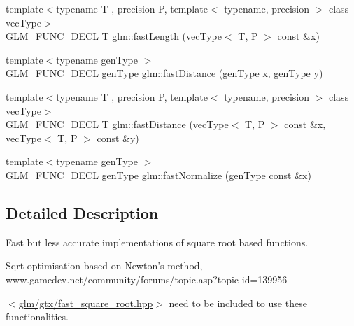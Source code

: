 \begin{DoxyCompactItemize}
{\footnotesize template$<$typename T , precision P, template$<$ typename, precision $>$ class vec\-Type$>$ }\\G\-L\-M\-\_\-\-F\-U\-N\-C\-\_\-\-D\-E\-C\-L T \hyperlink{group__gtx__fast__square__root_gae28a3099cbd6404a4ea8ef22147ed7b0}{glm\-::fast\-Length} (vec\-Type$<$ T, P $>$ const \&x)
\item 
{\footnotesize template$<$typename gen\-Type $>$ }\\G\-L\-M\-\_\-\-F\-U\-N\-C\-\_\-\-D\-E\-C\-L gen\-Type \hyperlink{group__gtx__fast__square__root_gaac333418d0c4e0cc6d3d219ed606c238}{glm\-::fast\-Distance} (gen\-Type x, gen\-Type y)
\item 
{\footnotesize template$<$typename T , precision P, template$<$ typename, precision $>$ class vec\-Type$>$ }\\G\-L\-M\-\_\-\-F\-U\-N\-C\-\_\-\-D\-E\-C\-L T \hyperlink{group__gtx__fast__square__root_ga6d1ac559cd77d69119e30c3aca0e14b5}{glm\-::fast\-Distance} (vec\-Type$<$ T, P $>$ const \&x, vec\-Type$<$ T, P $>$ const \&y)
\item 
{\footnotesize template$<$typename gen\-Type $>$ }\\G\-L\-M\-\_\-\-F\-U\-N\-C\-\_\-\-D\-E\-C\-L gen\-Type \hyperlink{group__gtx__fast__square__root_ga3b02c1d6e0c754144e2f1e110bf9f16c}{glm\-::fast\-Normalize} (gen\-Type const \&x)
\end{DoxyCompactItemize}


\subsection{Detailed Description}
Fast but less accurate implementations of square root based functions. 
\begin{DoxyItemize}
\item Sqrt optimisation based on Newton's method, www.\-gamedev.\-net/community/forums/topic.asp?topic id=139956
\end{DoxyItemize}

$<$\hyperlink{fast__square__root_8hpp}{glm/gtx/fast\-\_\-square\-\_\-root.\-hpp}$>$ need to be included to use these functionalities. 


